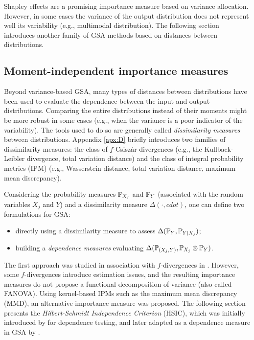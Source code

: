 Shapley effects are a promising importance measure based on variance allocation. 
However, in some cases the variance of the output distribution does not represent well its variability (e.g., multimodal distribution). 
The following section introduces another family of GSA methods based on distances between distributions.


\subsection{Moment-independent importance measures}
Beyond variance-based GSA, many types of distances between distributions have been used to evaluate the dependence between the input and output distributions. 
Comparing the entire distributions instead of their moments might be more robust in some cases (e.g., when the variance is a poor indicator of the variability). 
The tools used to do so are generally called \textit{dissimilarity measures} between distributions.  
Appendix \ref{apx:D} briefly introduces two families of dissimilarity measures: the class of $f$-Csisz\'{a}r divergences (e.g., the Kullback-Leibler divergence, total variation distance) and the class of integral probability metrics (IPM) (e.g., Wasserstein distance, total variation distance, maximum mean discrepancy). 

Considering the probability measures $\P_{X_j}$ and $\P_{Y}$ (associated with the random variables $X_j$ and $Y$) and a dissimilarity measure $\Delta(\cdot, cdot)$, one can define two formulations for GSA: 
\begin{itemize}
    \item directly using a dissimilarity measure to assess $\Delta(\P_Y, \P_{Y |X_j})$;
    \item building a \textit{dependence measures} evaluating $\Delta(\P_{(X_j, Y)}, \P_{X_j} \otimes \P_Y)$.
\end{itemize}

The first approach was studied in association with $f$-divergences in \citet{daveiga_2015,rahman_2016}. 
However, some $f$-divergences introduce estimation issues, and the resulting importance measures do not propose a functional decomposition of variance (also called FANOVA).  
Using kernel-based IPMs such as the maximum mean discrepancy (MMD), an alternative importance measure was proposed.  
The following section presents the \textit{Hilbert-Schmidt Independence Criterion} (HSIC), which was initially introduced by \citet{gretton_2006} for dependence testing, and later adapted as a dependence measure in GSA by \citet{daveiga_2015}. 



